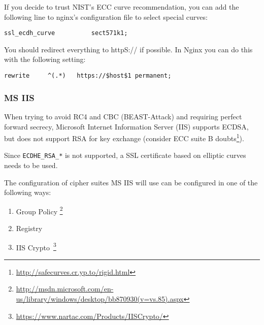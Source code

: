 

If you decide to trust NIST's ECC curve recommendation, you can add the following line to nginx's configuration file to select special curves:

\begin{lstlisting}[breaklines]
  ssl_ecdh_curve          sect571k1;
\end{lstlisting}

You should redirect everything to httpS:// if possible. In Nginx you can do this with the following setting:

\begin{lstlisting}[breaklines]
  rewrite     ^(.*)   https://$host$1 permanent;
\end{lstlisting}



\subsubsection{MS IIS}
\label{sec:ms-iis}



When trying to avoid RC4 and CBC (BEAST-Attack) and requiring perfect
forward secrecy, Microsoft Internet Information Server (IIS) supports
ECDSA, but does not support RSA for key exchange (consider ECC suite
B doubts\footnote{\url{http://safecurves.cr.yp.to/rigid.html}}).

Since \verb|ECDHE_RSA_*| is not supported, a SSL certificate based on
elliptic curves needs to be used.

The configuration of cipher suites MS IIS will use can be configured in one
of the following ways:
\begin{enumerate}
\item Group Policy \footnote{\url{http://msdn.microsoft.com/en-us/library/windows/desktop/bb870930(v=vs.85).aspx}}
\item Registry
\item IIS Crypto~\footnote{\url{https://www.nartac.com/Products/IISCrypto/}}
\end{enumerate}


